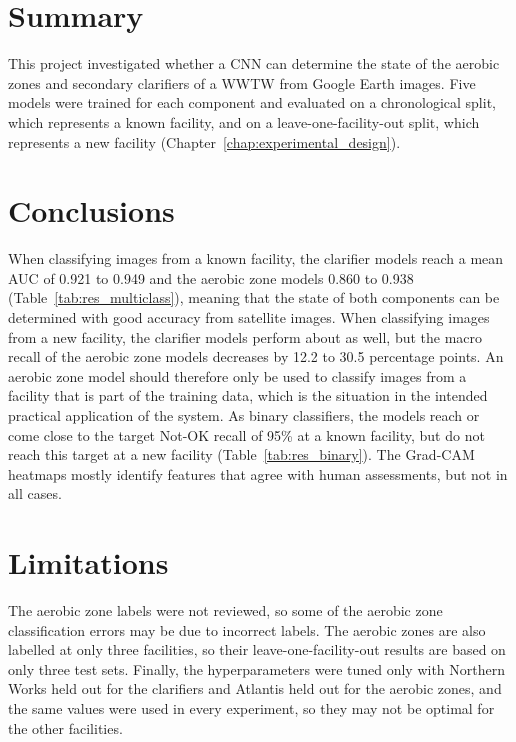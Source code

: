\graphicspath{{conclusion/fig/}}

\label{chap:conclusion}

\section{Summary}
\label{sec:conc_summary}

This project investigated whether a CNN can determine the state of the aerobic zones and secondary clarifiers of a WWTW from Google Earth images. Five models were trained for each component and evaluated on a chronological split, which represents a known facility, and on a leave-one-facility-out split, which represents a new facility (Chapter~\ref{chap:experimental_design}).

\section{Conclusions}
\label{sec:conc_conclusions}

When classifying images from a known facility, the clarifier models reach a mean AUC of 0.921 to 0.949 and the aerobic zone models 0.860 to 0.938 (Table~\ref{tab:res_multiclass}), meaning that the state of both components can be determined with good accuracy from satellite images. When classifying images from a new facility, the clarifier models perform about as well, but the macro recall of the aerobic zone models decreases by 12.2 to 30.5 percentage points. An aerobic zone model should therefore only be used to classify images from a facility that is part of the training data, which is the situation in the intended practical application of the system. As binary classifiers, the models reach or come close to the target Not-OK recall of 95\% at a known facility, but do not reach this target at a new facility (Table~\ref{tab:res_binary}). The Grad-CAM heatmaps mostly identify features that agree with human assessments, but not in all cases. 

\section{Limitations}
\label{sec:conc_limitations}

The aerobic zone labels were not reviewed, so some of the aerobic zone classification errors may be due to incorrect labels. The aerobic zones are also labelled at only three facilities, so their leave-one-facility-out results are based on only three test sets. Finally, the hyperparameters were tuned only with Northern Works held out for the clarifiers and Atlantis held out for the aerobic zones, and the same values were used in every experiment, so they may not be optimal for the other facilities.

